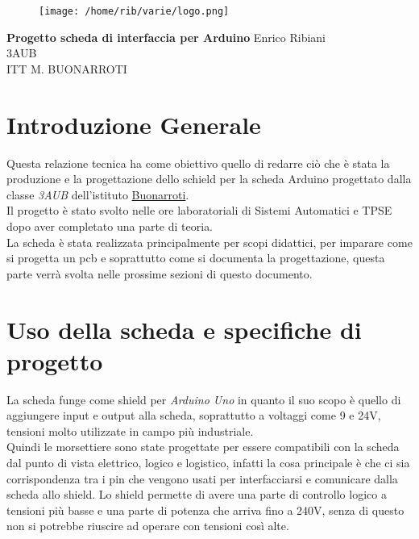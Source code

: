 \documentclass[12pt]{article}
\begin{document}
    \begin{titlepage}
\begin{flushleft}
\begin{figure}[h]
    \centering
    \texttt{[image: /home/rib/varie/logo.png]}
\end{figure}
\vspace{2\baselineskip}
\Huge{\textbf{Progetto scheda di interfaccia per Arduino}}
\vfill
\LARGE Enrico Ribiani\\
\LARGE 3AUB\\
\vfill
\huge{ITT M. BUONARROTI }

\end{flushleft}
\end{titlepage}
\pagestyle{fancy}
\fancyhead{}
\cfoot{\thepage}
\tableofcontents
{}
\vskip 3cm
\section{Introduzione Generale}
Questa relazione tecnica ha come obiettivo quello di redarre ciò che è stata la produzione e la progettazione dello schield per la scheda 
Arduino progettato dalla classe \textit{3AUB} dell'istituto \href{https://www.buonarroti.tn.it/}{Buonarroti}.\\
Il progetto è stato svolto nelle ore laboratoriali di Sistemi Automatici e TPSE dopo aver completato una parte di teoria.\\
La scheda è stata realizzata principalmente per scopi didattici, per imparare come si progetta un pcb e soprattutto come si documenta la progettazione, questa parte verrà svolta
nelle prossime sezioni di questo documento.\\
\section{Uso della scheda e specifiche di progetto}
La scheda funge come shield per \textit{Arduino Uno} in quanto il suo scopo è quello di aggiungere input e output alla scheda, soprattutto 
a voltaggi come 9 e 24V, tensioni molto utilizzate in campo più industriale.\\
Quindi le morsettiere sono state progettate per essere compatibili con la scheda dal punto di vista elettrico, logico e logistico, infatti la cosa principale è che 
ci sia corrispondenza tra i pin che vengono usati per interfacciarsi e comunicare dalla scheda allo shield.
Lo shield permette di avere una parte di controllo logico a tensioni più basse e una parte di potenza che arriva fino a 240V, senza di questo non si potrebbe riuscire ad operare con 
tensioni così alte.
\end{document}
